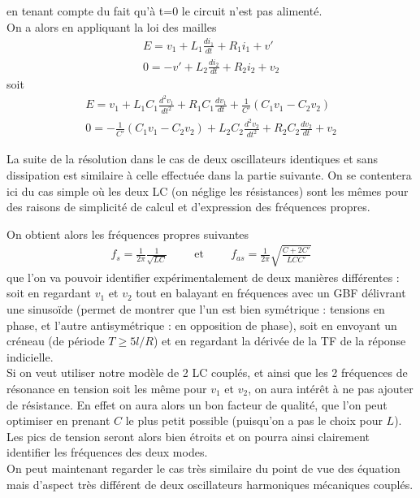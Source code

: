 \documentclass[12pt,prb,aps,epsf]{article}
\begin{document}
en tenant compte du fait qu'à t=0 le circuit n'est pas alimenté.\\
On a alors en appliquant la loi des mailles 
	\begin{eqnarray}
	E = v_1 + L_1\frac{di_1}{dt} + R_1i_1 + v'\\
	0 = -v' + L_2\frac{di_2}{dt} + R_2i_2 + v_2
	\end{eqnarray}
soit 
	\begin{eqnarray}
	E = v_1 + L_1C_1\frac{d^2v_1}{dt^2} + R_1C_1\frac{dv_1}{dt} + \frac{1}{C'}(C_1v_1 -C_2v_2)\\
	0 = -\frac{1}{C'}(C_1v_1 -C_2v_2) + L_2C_2\frac{d^2v_2}{dt^2} + R_2C_2\frac{dv_2}{dt} + v_2
	\end{eqnarray}
	
La suite de la résolution dans le cas de deux oscillateurs identiques et sans dissipation est similaire à celle effectuée dans la partie suivante. On se contentera ici du cas simple où les deux LC (on néglige les résistances) sont les mêmes pour des raisons de simplicité de calcul et d'expression des fréquences propres.

On obtient alors les fréquences propres suivantes 
\begin{eqnarray}
f_s = \frac{1}{2\pi} \frac{1}{\sqrt{LC}}\hspace{1cm}\mathrm{et}\hspace{1cm}f_{as} = \frac{1}{2\pi} \sqrt{\frac{C + 2C'}{LCC'}}
\end{eqnarray}
que l'on va pouvoir identifier expérimentalement de deux manières différentes : soit en regardant $v_1$ et $v_2$ tout en balayant en fréquences avec un GBF délivrant une sinusoïde (permet de montrer que l'un est bien symétrique : tensions en phase, et l'autre antisymétrique : en opposition de phase), soit en envoyant un créneau (de période $T\geq 5l/R$) et en regardant la dérivée de la TF de la réponse indicielle. \\

Si on veut utiliser notre modèle de 2 LC couplés, et ainsi que les 2 fréquences de résonance en tension soit les même pour $v_1$ et $v_2$, on aura intérêt à ne pas ajouter de résistance. En effet on aura alors un bon facteur de qualité, que l'on peut optimiser en prenant $C$ le plus petit possible (puisqu'on a pas le choix pour $L$). Les pics de tension seront alors bien étroits et on pourra ainsi clairement identifier les fréquences des deux modes.\\

On peut maintenant regarder le cas très similaire du point de vue des équation mais d'aspect très différent de deux oscillateurs harmoniques mécaniques couplés.
\end{document}
